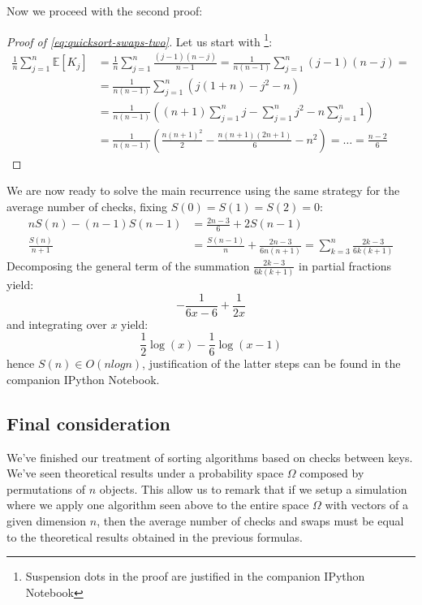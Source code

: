 Now we proceed with the second proof:
\begin{proof}[Proof of \autoref{eq:quicksort-swaps-two}]
  Let us start with \footnote{Suspension dots in the proof are
  justified in the companion IPython Notebook}:
  \begin{displaymath}
    \begin{split}
      \frac{1}{n}\sum_{j=1}^{n}{\mathbb{E} \left[K_j \right] } &=
      \frac{1}{n} \sum_{j=1}^{n}{\frac{(j-1)(n-j)}{n-1}} =
      \frac{1}{n(n-1)} \sum_{j=1}^{n}{(j-1)(n-j)}=\\
      &=\frac{1}{n(n-1)} \sum_{j=1}^{n}{(j(1+n)-j^2-n)} \\
      &=\frac{1}{n(n-1)} \left( (n+1)\sum_{j=1}^{n}{j} -
        \sum_{j=1}^{n}{j^2} -n \sum_{j=1}^{n}{1}  \right)\\
      &=\frac{1}{n(n-1)}\left( \frac{n(n+1)^2}{2} -
        \frac{n(n+1)(2n+1)}{6} - n^2 \right) = \ldots =  \frac{n-2}{6}
    \end{split}
  \end{displaymath}
\end{proof}

We are now ready to solve the main recurrence using the same strategy
for the average number of checks, fixing $S(0) = S(1) = S(2) =
0$:
\begin{displaymath}
  \begin{split}
    nS(n) - (n-1)S(n-1) &=  \frac{2n-3}{6} + 2S(n-1)\\
    \frac{S(n)}{n+1} &=  \frac{S(n-1)}{n} +  \frac{2n -3}{6n(n+1)} =
      \sum_{k=3}^{n}{ \frac{2k-3}{6k(k+1)} }
  \end{split}
\end{displaymath}
Decomposing the general term of the summation $ \frac{2k-3}{6k(k+1)}$
in partial fractions yield: $$- \frac{1}{6 x - 6} + \frac{1}{2 x}$$
and integrating over $x$ yield: $$\frac{1}{2} \log{\left (x \right )} -
\frac{1}{6} \log{\left (x - 1 \right )}$$
hence $S(n) \in O(n logn)$, justification of the latter steps can be found
in the companion IPython Notebook.


\subsection{Final consideration}

We've finished our treatment of sorting algorithms based on checks
between keys. We've seen theoretical results under a probability space
$\Omega$ composed by permutations of $n$ objects. This allow us to
remark that if we setup a simulation where we apply one algorithm seen
above to the entire space $\Omega$ with vectors of a given dimension
$n$, then the average number of checks and swaps must be equal to the
theoretical results obtained in the previous formulas.
